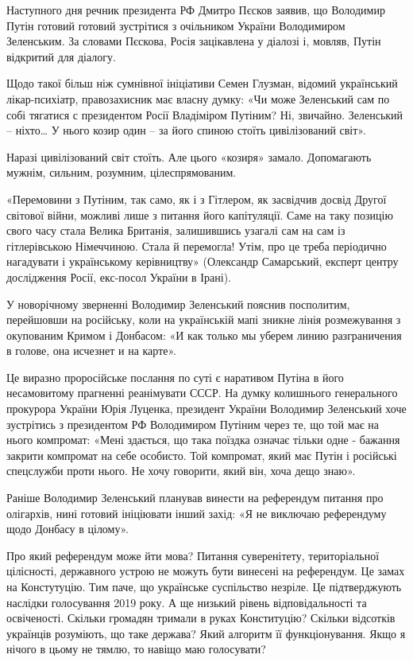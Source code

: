 Наступного дня речник президента РФ Дмитро Пєсков заявив, що Володимир Путін
готовий готовий зустрітися з очільником України Володимиром Зеленським. За
словами Пєскова, Росія зацікавлена у діалозі і, мовляв, Путін відкритий для
діалогу.

Щодо такої більш ніж сумнівної ініціативи Семен Глузман, відомий український
лікар-психіатр, правозахисник має власну думку: «Чи може Зеленський сам по собі
тягатися с президентом Росії Владіміром Путіним? Ні, звичайно. Зеленський –
ніхто… У нього козир один – за його спиною стоїть цивілізований світ».

Наразі цивілізований світ стоїть. Але цього «козиря» замало. Допомагають
мужнім, сильним, розумним, цілеспрямованим.

«Перемовини з Путіним, так само, як і з Гітлером, як засвідчив досвід Другої
світової війни, можливі лише з питання його капітуляції. Саме на таку позицію
свого часу стала Велика Британія, залишившись узагалі сам на сам із
гітлерівською Німеччиною. Стала й перемогла! Утім, про це треба періодично
нагадувати і українському керівництву» (Олександр Самарський, експерт центру
дослідження Росії, екс-посол України в Ірані).

У новорічному зверненні Володимир Зеленський пояснив посполитим, перейшовши на
російську, коли на українській мапі зникне лінія розмежування з окупованим
Кримом і Донбасом: «И как только мы уберем линию разграничения в голове, она
исчезнет и на карте».

Це виразно проросійське послання по суті є наративом Путіна в його несамовитому
прагненні реанімувати СССР. На думку колишнього генерального прокурора України
Юрія Луценка, президент України Володимир Зеленський хоче зустрітись з
президентом РФ Володимиром Путіним через те, що той має на нього компромат:
«Мені здається, що така поїздка означає тільки одне - бажання закрити компромат
на себе особисто. Той компромат, який має Путін і російські спецслужби проти
нього. Не хочу говорити, який він, хоча дещо знаю».

Раніше Володимир Зеленський планував винести на референдум питання про
олігархів, нині готовий ініціювати інший захід: «Я не виключаю референдуму щодо
Донбасу в цілому».

Про який референдум може йти мова? Питання суверенітету, територіальної
цілісності, державного устрою не можуть бути винесені на референдум. Це замах
на Констутуцію. Тим паче, що українське суспільство незріле. Це підтверджують
наслідки голосування 2019 року. А ще низький рівень відповідальності та
освіченості. Скільки громадян тримали в руках Конституцію? Скільки відсотків
українців розуміють, що таке держава? Який алгоритм її функціонування. Якщо я
нічого в цьому не тямлю, то навіщо маю голосувати?

